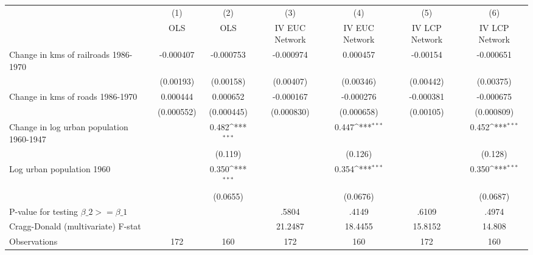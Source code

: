 {
\def\sym#1{\ifmmode^{#1}\else\(^{#1}\)\fi}
\begin{tabular}{l*{6}{c}}
\hline\hline
                &\multicolumn{1}{c}{(1)}&\multicolumn{1}{c}{(2)}&\multicolumn{1}{c}{(3)}&\multicolumn{1}{c}{(4)}&\multicolumn{1}{c}{(5)}&\multicolumn{1}{c}{(6)}\\
                &\multicolumn{1}{c}{OLS}&\multicolumn{1}{c}{OLS}&\multicolumn{1}{c}{IV EUC Network}&\multicolumn{1}{c}{IV EUC Network}&\multicolumn{1}{c}{IV LCP Network}&\multicolumn{1}{c}{IV LCP Network}\\
\hline
Change in kms of railroads 1986-1970&-0.000407         &-0.000753         &-0.000974         & 0.000457         & -0.00154         &-0.000651         \\
                &(0.00193)         &(0.00158)         &(0.00407)         &(0.00346)         &(0.00442)         &(0.00375)         \\
[1em]
Change in kms of roads 1986-1970& 0.000444         & 0.000652         &-0.000167         &-0.000276         &-0.000381         &-0.000675         \\
                &(0.000552)         &(0.000445)         &(0.000830)         &(0.000658)         &(0.00105)         &(0.000809)         \\
[1em]
Change in log urban population 1960-1947&                  &    0.482\sym{***}&                  &    0.447\sym{***}&                  &    0.452\sym{***}\\
                &                  &  (0.119)         &                  &  (0.126)         &                  &  (0.128)         \\
[1em]
Log urban population 1960&                  &    0.350\sym{***}&                  &    0.354\sym{***}&                  &    0.350\sym{***}\\
                &                  & (0.0655)         &                  & (0.0676)         &                  & (0.0687)         \\
\hline
P-value for testing $\beta\_{2} >= \beta\_{1}$&                  &                  &    .5804         &    .4149         &    .6109         &    .4974         \\
Cragg-Donald (multivariate) F-stat&                  &                  &  21.2487         &  18.4455         &  15.8152         &   14.808         \\
Observations    &      172         &      160         &      172         &      160         &      172         &      160         \\
\hline\hline
\end{tabular}
}
